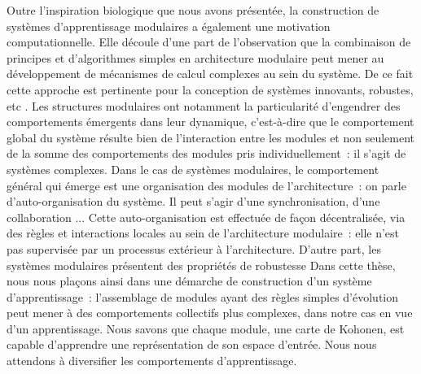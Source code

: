 Outre l'inspiration biologique que nous avons présentée, la construction de systèmes d'apprentissage modulaires a également une motivation computationnelle.
Elle découle d'une part de l'observation que la combinaison de principes et d'algorithmes simples en architecture modulaire peut mener au développement de mécanismes de calcul complexes au sein du système. De ce fait cette approche est pertinente pour la conception de systèmes innovants, robustes, etc \cite{chen_modularity_2016}.
Les structures modulaires ont notamment la particularité d'engendrer des comportements émergents dans leur dynamique, c'est-à-dire que le comportement global du système résulte bien de l'interaction entre les modules et non seulement de la somme des comportements des modules pris individuellement~: il s'agit de systèmes complexes.
Dans le cas de systèmes modulaires, le comportement général qui émerge est une organisation des modules de l'architecture~: on parle d'auto-organisation du système. Il peut s'agir d'une synchronisation, d'une collaboration ...
Cette auto-organisation est effectuée de façon décentralisée, via des règles et interactions locales au sein de l'architecture modulaire~: elle n'est pas supervisée par un processus extérieur à l'architecture.
D'autre part, les systèmes modulaires présentent des propriétés de robustesse
\cite{Tang2021ARO}
Dans cette thèse, nous nous plaçons ainsi dans une démarche de construction d'un système d'apprentissage~: l'assemblage de modules ayant des règles simples d'évolution peut mener à des comportements collectifs plus complexes, dans notre cas en vue d'un apprentissage. Nous savons que chaque module, une carte de Kohonen, est capable d'apprendre une représentation de son espace d'entrée. Nous nous attendons à diversifier les comportements d'apprentissage.
\cite{chen_modularity_2016}


